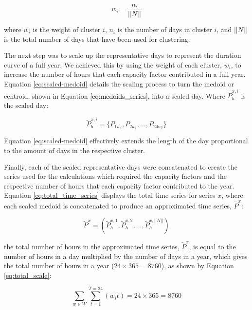 \begin{equation}
\label{eq:cluster_weight}
w_i = \frac{n_i}{||N||} 
\end{equation} 

\noindent where $w_i$ is the weight of cluster $i$, $n_i$ is the number of days in cluster $i$, and $||N||$ is the total number of days that have been used for clustering. 


The next step was to scale up the representative days to represent the duration curve of a full year. We achieved this by using the weight of each cluster, $w_i$, to increase the number of hours that each capacity factor contributed in a full year. Equation \ref{eq:scaled-medoid} details the scaling process to turn the medoid or centroid, shown in Equation \ref{eq:medoids_series}, into a scaled day. Where $\widetilde{P}^{x,i}_{h}$ is the scaled day:

\begin{equation}
\label{eq:scaled-medoid}
\widetilde{P}^{x,i}_{h} =  \{P_{1w_i}, P_{2w_i}, \ldots, P_{24w_i}\}
\end{equation} 

\noindent Equation \ref{eq:scaled-medoid} effectively extends the length of the day proportional to the amount of days in the respective cluster.



Finally, each of the scaled representative days were concatenated to create the series used for the calculations which required the capacity factors and the respective number of hours that each capacity factor contributed to the year. Equation \ref{eq:total_time_series} displays the total time series for series $x$, where each scaled medoid is concatenated to produce an approximated time series, $\widetilde{P}^x$:


\begin{equation}
\label{eq:total_time_series}
\widetilde{P}^x=\left(\widetilde{P}^{x,1}_{h},\widetilde{P}^{x,2}_{h},\ldots, \widetilde{P}^{x,||N||}_{h}\right)
\end{equation}

\noindent the total number of hours in the approximated time series, $\widetilde{P}^x$, is equal to the number of hours in a day multiplied by the number of days in a year, which gives the total number of hours in a year ($24\times 365=8760$), as shown by Equation \ref{eq:total_scale}:


\begin{equation}
\label{eq:total_scale}
\sum\limits_{w\in W}\sum\limits_{t=1}^{T=24}\left(w_i t\right)=24\times 365=8760
\end{equation}

